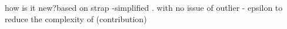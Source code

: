 


how is it new?based on strap -simplified . with no issue of outlier - epsilon to reduce the complexity of (contribution) 